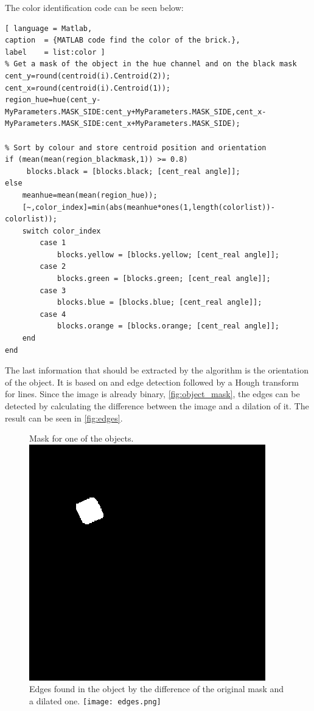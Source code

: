 The color identification code can be seen below:
%
\begin{lstlisting}[ language = Matlab,
caption  = {MATLAB code find the color of the brick.},
label    = list:color ]
% Get a mask of the object in the hue channel and on the black mask
cent_y=round(centroid(i).Centroid(2));
cent_x=round(centroid(i).Centroid(1));
region_hue=hue(cent_y-MyParameters.MASK_SIDE:cent_y+MyParameters.MASK_SIDE,cent_x-MyParameters.MASK_SIDE:cent_x+MyParameters.MASK_SIDE);

% Sort by colour and store centroid position and orientation
if (mean(mean(region_blackmask,1)) >= 0.8)
     blocks.black = [blocks.black; [cent_real angle]];
else
    meanhue=mean(mean(region_hue));
    [~,color_index]=min(abs(meanhue*ones(1,length(colorlist))-colorlist));
    switch color_index
        case 1
            blocks.yellow = [blocks.yellow; [cent_real angle]];
        case 2
            blocks.green = [blocks.green; [cent_real angle]];
        case 3
            blocks.blue = [blocks.blue; [cent_real angle]];
        case 4
            blocks.orange = [blocks.orange; [cent_real angle]];
    end
end
\end{lstlisting}

The last information that should be extracted by the algorithm is the orientation of the object. It is based on and edge detection followed by a Hough transform for lines. Since the image is already binary, \autoref{fig:object_mask}, the edges can be detected by calculating the difference between the image and a dilation of it. The result can be seen in \autoref{fig:edges}.
%
\begin{figure}[H]
	\captionbox  %
	{
		Mask for one of the objects.              
		\label{fig:object_mask}                                  
	}                                                                 
	{                                                                  
		\includegraphics[width=.25\textwidth]{figures/object_mask.png}         
	}                                                                    
	\hspace{5pt}                                                          
	\captionbox
	{       
		Edges found in the object by the difference of the original mask and a dilated one.
		\label{fig:edges}                                     
	}
	{
		\texttt{[image: edges.png]}            
	}                                                                              
\end{figure}

